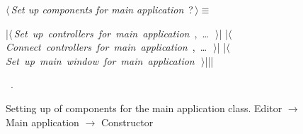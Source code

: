 \documentclass[%
    a4paper,    %
    justified,  %
    nobib,      %
    openany     %
]{tufte-book}
\makeatletter
\renewcommand{\label}[1]{\@tufte@label{##1}}%
\makeatother
\begin{document}
\begin{figure}
\begin{flushleft} \small
\begin{minipage}{\linewidth}\label{scrap18}\raggedright\small
{} $\langle\,${\itshape Set up components for main application}\nobreak\ {\footnotesize {?}}$\,\rangle\equiv$
\vspace{-1ex}
\begin{pythoncode}
|\hbox{$\langle\,${\itshape Set up controllers for main application}\nobreak\ {\footnotesize {}, \ldots\ }$\,\rangle$}|
|\hbox{$\langle\,${\itshape Connect controllers for main application}\nobreak\ {\footnotesize {}, \ldots\ }$\,\rangle$}|
|\hbox{$\langle\,${\itshape Set up main window for main application}\nobreak\ {\footnotesize {}}$\,\rangle$}||\NWsep|
\end{pythoncode}
\vspace{1.5ex}
\footnotesize
\begin{list}{}{\setlength{\itemsep}{-\parsep}\setlength{\itemindent}{-\leftmargin}}
\item \NWtxtMacroRefIn\ .

\item{}
\end{list}
\end{minipage}\vspace{4ex}
\end{flushleft}
\caption{Setting up of components for the main application class.
  \newline{}\newline{}Editor $\rightarrow$ Main application $\rightarrow$
  Constructor}
\label{editor:lst:main-application:constructor:methods}
\end{figure}
\end{document}
